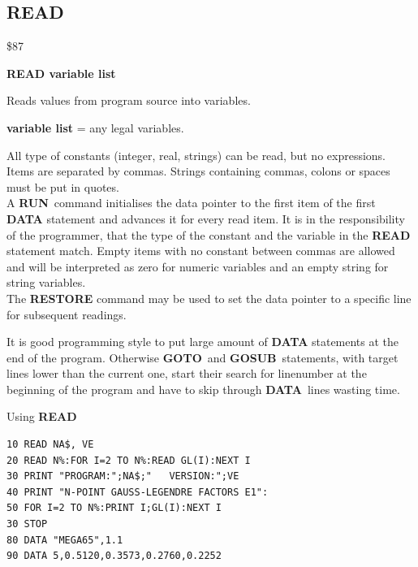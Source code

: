 \subsection{READ}
\begin{description}[leftmargin=2cm,style=nextline]
\item [Token:] \$87
\item [Format:] {\bf READ variable list}
\item [Usage:]  Reads values from program source into variables.

                {\bf variable list} = any legal variables.

               All type of constants (integer, real,
               strings) can be read, but no expressions.
               Items are separated by commas.
               Strings containing commas, colons or spaces must be put
               in quotes. \\
               A {\bf RUN} command initialises the data pointer
               to the first item of the first {\bf DATA} statement
               and advances it for every read item. It is in the
               responsibility of the programmer, that the type of
               the constant and the variable in the {\bf READ}
               statement match. Empty items with no constant
               between commas are allowed and will be interpreted as
               zero for numeric variables and an empty string for
               string variables. \\
               The {\bf RESTORE} command may be used to set the
               data pointer to a specific line for subsequent
               readings.

\item [Remarks:] It is good programming style to put large amount of
               {\bf DATA} statements at the end of the program.
               Otherwise {\bf GOTO} and {\bf GOSUB} statements, with
               target lines lower than the current one,
               start their search for linenumber at the beginning of
               the program and have to skip through {\bf DATA} lines
               wasting time.
\item [Example:] Using {\bf READ}
\begin{tcolorbox}[colback=black,coltext=white]
\verbatimfont{\codefont}
\begin{verbatim}
10 READ NA$, VE
20 READ N%:FOR I=2 TO N%:READ GL(I):NEXT I
30 PRINT "PROGRAM:";NA$;"   VERSION:";VE
40 PRINT "N-POINT GAUSS-LEGENDRE FACTORS E1":
50 FOR I=2 TO N%:PRINT I;GL(I):NEXT I
30 STOP
80 DATA "MEGA65",1.1
90 DATA 5,0.5120,0.3573,0.2760,0.2252
\end{verbatim}
\end{tcolorbox}
\end{description}

